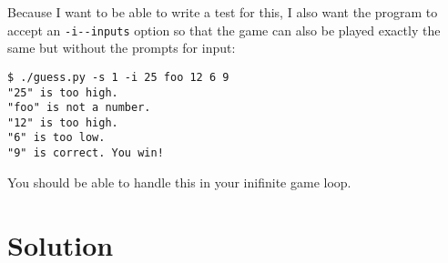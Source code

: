 \documentclass[]{article}
\begin{document}
Because I want to be able to write a test for this, I also want the
program to accept an \texttt{-i\textbar{}-\/-inputs} option so that the
game can also be played exactly the same but without the prompts for
input:

\begin{verbatim}
$ ./guess.py -s 1 -i 25 foo 12 6 9
"25" is too high.
"foo" is not a number.
"12" is too high.
"6" is too low.
"9" is correct. You win!
\end{verbatim}

You should be able to handle this in your inifinite game loop.

\pagebreak

\hypertarget{solution-14}{%
\section{Solution}\label{solution-14}}
\end{document}
